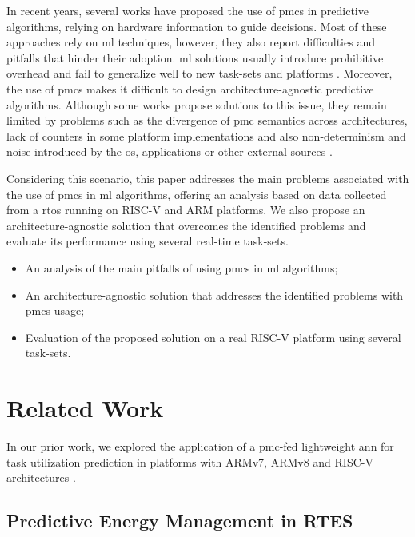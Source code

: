 \documentclass[conference]{IEEEtran}
\begin{document}
In recent years, several works have proposed the use of \glspl{pmc} in predictive algorithms, relying on hardware information to guide decisions. Most of these approaches rely on \gls{ml} techniques, however, they also report difficulties and pitfalls that hinder their adoption. \gls{ml} solutions usually introduce prohibitive overhead and fail to generalize well to new task-sets and platforms \cite{rahim2025survey}. Moreover, the use of \glspl{pmc} makes it difficult to design architecture-agnostic predictive algorithms. Although some works propose solutions to this issue, they remain limited by problems such as the divergence of \gls{pmc} semantics across architectures, lack of counters in some platform implementations and also non-determinism and noise introduced by the \gls{os}, applications or other external sources \cite{das2019sok}.

Considering this scenario, this paper addresses the main problems associated with the use of \glspl{pmc} in \gls{ml} algorithms, offering an analysis based on data collected from a \gls{rtos} running on RISC-V and ARM platforms. We also propose an architecture-agnostic solution that overcomes the identified problems and evaluate its performance using several real-time task-sets.

\begin{itemize}
    \item An analysis of the main pitfalls of using \glspl{pmc} in \gls{ml} algorithms;
    \item An architecture-agnostic solution that addresses the identified problems with \glspl{pmc} usage;
    \item Evaluation of the proposed solution on a real RISC-V platform using several task-sets.
\end{itemize}

\section{Related Work}

In our prior work, we explored the application of a \gls{pmc}-fed lightweight \gls{ann} for task utilization prediction in platforms with ARMv7, ARMv8 and RISC-V architectures \cite{hoffmann2021online, hoffmann2024lightweight}. %

\subsection{Predictive Energy Management in RTES}
\end{document}
